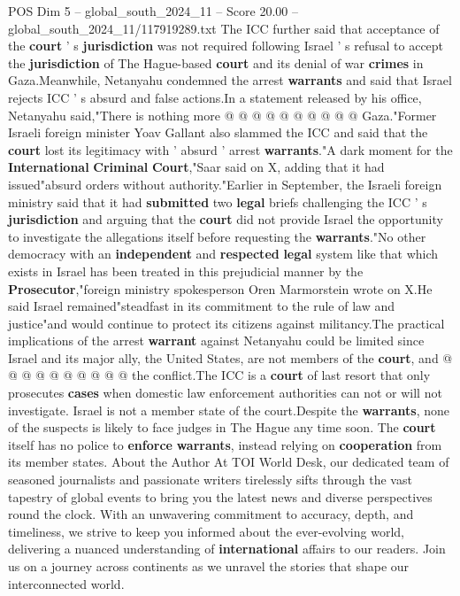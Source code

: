 \begin{textsample}{POS Dim 5 – global\_south\_2024\_11 – Score 20.00 – global\_south\_2024\_11/117919289.txt}
The ICC further said that acceptance of the \textbf{court} ' s \textbf{jurisdiction} was not required following Israel ' s refusal to accept the \textbf{jurisdiction} of The Hague-based \textbf{court} and its denial of war \textbf{crimes} in Gaza.Meanwhile, Netanyahu condemned the arrest \textbf{warrants} and said that Israel rejects ICC ' s absurd and false actions.In a statement released by his office, Netanyahu said,"There is nothing more @ @ @ @ @ @ @ @ @ @ Gaza."Former Israeli foreign minister Yoav Gallant also slammed the ICC and said that the \textbf{court} lost its legitimacy with ' absurd ' arrest \textbf{warrants}."A dark moment for the \textbf{International} \textbf{Criminal} \textbf{Court},"Saar said on X, adding that it had issued"absurd orders without authority."Earlier in September, the Israeli foreign ministry said that it had \textbf{submitted} two \textbf{legal} briefs challenging the ICC ' s \textbf{jurisdiction} and arguing that the \textbf{court} did not provide Israel the opportunity to investigate the allegations itself before requesting the \textbf{warrants}."No other democracy with an \textbf{independent} and \textbf{respected} \textbf{legal} system like that which exists in Israel has been treated in this prejudicial manner by the \textbf{Prosecutor},"foreign ministry spokesperson Oren Marmorstein wrote on X.He said Israel remained"steadfast in its commitment to the rule of law and justice"and would continue to protect its citizens against militancy.The practical implications of the arrest \textbf{warrant} against Netanyahu could be limited since Israel and its major ally, the United States, are not members of the \textbf{court}, and @ @ @ @ @ @ @ @ @ @ the conflict.The ICC is a \textbf{court} of last resort that only prosecutes \textbf{cases} when domestic law enforcement authorities can not or will not investigate.
Israel is not a member state of the court.Despite the \textbf{warrants}, none of the suspects is likely to face judges in The Hague any time soon.
The \textbf{court} itself has no police to \textbf{enforce} \textbf{warrants}, instead relying on \textbf{cooperation} from its member states.
About the Author At TOI World Desk, our dedicated team of seasoned journalists and passionate writers tirelessly sifts through the vast tapestry of global events to bring you the latest news and diverse perspectives round the clock.
With an unwavering commitment to accuracy, depth, and timeliness, we strive to keep you informed about the ever-evolving world, delivering a nuanced understanding of \textbf{international} affairs to our readers.
Join us on a journey across continents as we unravel the stories that shape our interconnected world.

\end{textsample}
